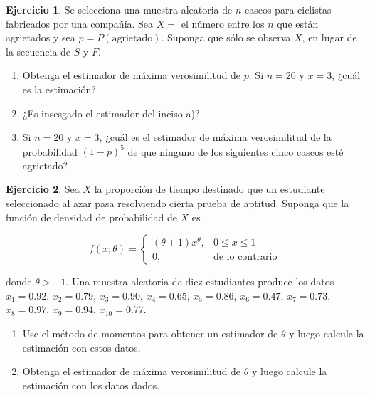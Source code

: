 \documentclass[
  11pt,
]{book}
\theoremstyle{definition}
\theoremstyle{definition}
\theoremstyle{definition}
\newtheorem{exercise}{Ejercicio}[chapter]
\theoremstyle{definition}
\theoremstyle{remark}
\begin{document}
\begin{exercise}

Se selecciona una muestra aleatoria de \(n\) cascos para ciclistas fabricados por una compañía. Sea \(X =\) el número entre los \(n\) que están agrietados y sea \(p = P(\text{agrietado})\). Suponga que sólo se observa \(X\), en lugar de la secuencia de \(S\) y \(F\).

\begin{enumerate}
\def\labelenumi{\alph{enumi}.}
\item
  Obtenga el estimador de máxima verosimilitud de \(p\). Si \(n = 20\) y \(x = 3\), ¿cuál es la estimación?
\item
  ¿Es insesgado el estimador del inciso a)?
\item
  Si \(n = 20\) y \(x = 3\), ¿cuál es el estimador de máxima verosimilitud de la probabilidad \((1 - p)^5\) de que ninguno de los siguientes cinco cascos esté agrietado?
\end{enumerate}

\end{exercise}

\begin{exercise}

Sea \(X\) la proporción de tiempo destinado que un estudiante seleccionado al azar pasa resolviendo cierta prueba de aptitud. Suponga que la función de densidad de probabilidad de \(X\) es

\[
f(x; \theta) =
\begin{cases} 
(\theta + 1)x^\theta, & 0 \leq x \leq 1 \\
0, & \text{de lo contrario}
\end{cases}
\]

donde \(\theta > -1\). Una muestra aleatoria de diez estudiantes produce los datos \(x_1 = 0.92\), \(x_2 = 0.79\), \(x_3 = 0.90\), \(x_4 = 0.65\), \(x_5 = 0.86\), \(x_6 = 0.47\), \(x_7 = 0.73\), \(x_8 = 0.97\), \(x_9 = 0.94\), \(x_{10} = 0.77\).

\begin{enumerate}
\def\labelenumi{\alph{enumi}.}
\item
  Use el método de momentos para obtener un estimador de \(\theta\) y luego calcule la estimación con estos datos.
\item
  Obtenga el estimador de máxima verosimilitud de \(\theta\) y luego calcule la estimación con los datos dados.
\end{enumerate}

\end{exercise}
\end{document}
